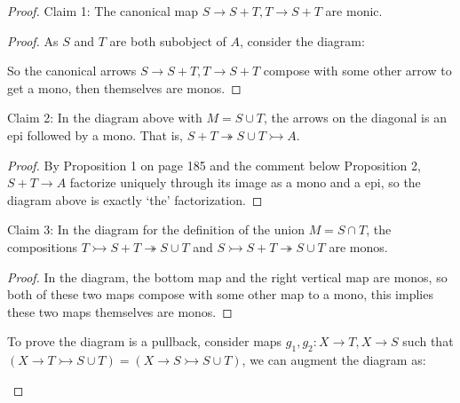 \documentclass[a4paper]{article}
\begin{document}
\begin{proof}
    Claim 1: The canonical map $S\to S + T,T\to S+T$ are monic.
    \begin{proof}
        As $S$ and $T$ are both subobject of $A$, consider the diagram:

        \begin{center}
        \end{center}

        So the canonical arrows $S\to S+T,T\to S+T$ compose with some other arrow to get a mono, then themselves are monos. 
    \end{proof}

    Claim 2: In the diagram above with $M=S\cup T$, the arrows on the diagonal is an epi followed by a mono. That is, $S+T\twoheadrightarrow S\cup T\rightarrowtail A$. 

    \begin{proof}
        By Proposition 1 on page 185 and the comment below Proposition 2, $S+T\to A$ factorize uniquely through its image as a mono and a epi, so the diagram above is exactly `the' factorization.
    \end{proof}

    Claim 3: In the diagram for the definition of the union $M= S\cap T$, the compositions $T\rightarrowtail S+T\twoheadrightarrow S\cup T$ and $S\rightarrowtail S+T\twoheadrightarrow S\cup T$ are monos.

    \begin{proof}
        In the diagram, the bottom map and the right vertical map are monos, so both of these two maps compose with some other map to a mono, this implies these two maps themselves are monos. 
    \end{proof}

    To prove the diagram is a pullback, consider maps $g_1,g_2:X\to T, X\to S$ such that $(X\to T\rightarrowtail S\cup T) = (X\to S\rightarrowtail S\cup T)$, we can augment the diagram as:

    \begin{center}
    \end{center}


\end{proof}
\end{document}

